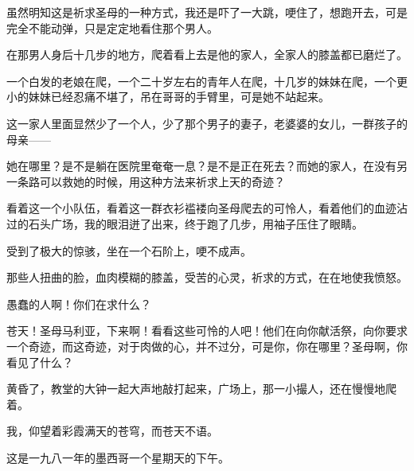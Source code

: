 \par 虽然明知这是祈求圣母的一种方式，我还是吓了一大跳，哽住了，想跑开去，可是完全不能动弹，只是定定地看住那个男人。
\par 在那男人身后十几步的地方，爬着看上去是他的家人，全家人的膝盖都已磨烂了。
\par 一个白发的老娘在爬，一个二十岁左右的青年人在爬，十几岁的妹妹在爬，一个更小的妹妹已经忍痛不堪了，吊在哥哥的手臂里，可是她不站起来。
\par 这一家人里面显然少了一个人，少了那个男子的妻子，老婆婆的女儿，一群孩子的母亲——
\par 她在哪里？是不是躺在医院里奄奄一息？是不是正在死去？而她的家人，在没有另一条路可以救她的时候，用这种方法来祈求上天的奇迹？
\par 看着这一个小队伍，看着这一群衣衫褴褛向圣母爬去的可怜人，看着他们的血迹沾过的石头广场，我的眼泪迸了出来，终于跑了几步，用袖子压住了眼睛。
\par 受到了极大的惊骇，坐在一个石阶上，哽不成声。
\par 那些人扭曲的脸，血肉模糊的膝盖，受苦的心灵，祈求的方式，在在地使我愤怒。
\par 愚蠢的人啊！你们在求什么？
\par 苍天！圣母马利亚，下来啊！看看这些可怜的人吧！他们在向你献活祭，向你要求一个奇迹，而这奇迹，对于肉做的心，并不过分，可是你，你在哪里？圣母啊，你看见了什么？
\par 黄昏了，教堂的大钟一起大声地敲打起来，广场上，那一小撮人，还在慢慢地爬着。
\par 我，仰望着彩霞满天的苍穹，而苍天不语。
\par 这是一九八一年的墨西哥一个星期天的下午。

